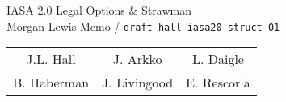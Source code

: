 \documentclass[helvetica]{seminar}
\begin{document}
\begin{slide}
\begin{center}
\vspace{.5 in}
\LARGE{{\bf}IASA 2.0 Legal Options \& Strawman\\{\small Morgan Lewis Memo / \verb^draft-hall-iasa20-struct-01^}}\\
\vspace{.2in}
\large{
\begin{tabular}{ c c c }
J.L. Hall  & J. Arkko & L. Daigle \\
B. Haberman & J. Livingood  & E. Rescorla 
\end{tabular}
}
\end{center}
\end{slide}

\centerslidesfalse 
\end{document}
